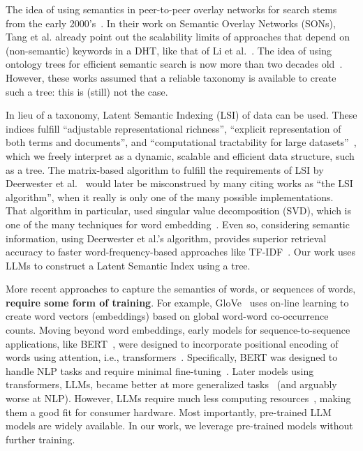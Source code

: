 \documentclass[10pt,journal]{IEEEtran}
\begin{document}
The idea of using semantics in peer-to-peer overlay networks for search stems from the early 2000's~\cite{tang2003peer}.
In their work on Semantic Overlay Networks (SONs), Tang et al. already point out the scalability limits of approaches that depend on (non-semantic) keywords in a DHT, like that of Li et al.~\cite{li2003feasibility}.
The idea of using ontology trees for efficient semantic search is now more than two decades old~\cite{crespo2004semantic}.
However, these works assumed that a reliable taxonomy is available to create such a tree: this is (still) not the case.

In lieu of a taxonomy, Latent Semantic Indexing (LSI) of data can be used.
These indices fulfill ``adjustable representational richness'', ``explicit representation of both terms and documents'', and ``computational tractability for large datasets''~\cite{deerwester1990indexing}, which we freely interpret as a dynamic, scalable and efficient data structure, such as a tree.
The matrix-based algorithm to fulfill the requirements of LSI by Deerwester et al.~\cite{deerwester1990indexing} would later be misconstrued by many citing works as ``the LSI algorithm'', when it really is only one of the many possible implementations.
That algorithm in particular, used singular value decomposition (SVD), which is one of the many techniques for word embedding~\cite{johnson2024detailed}.
Even so, considering semantic information, using Deerwester et al.'s algorithm, provides superior retrieval accuracy to faster word-frequency-based approaches like TF-IDF~\cite{zhang2011comparative}. 
Our work uses LLMs to construct a Latent Semantic Index using a tree.

More recent approaches to capture the semantics of words, or sequences of words, \textbf{require some form of training}.
For example, GloVe~\cite{pennington2014glove} uses on-line learning to create word vectors (embeddings) based on global word-word co-occurrence counts.
Moving beyond word embeddings, early models for sequence-to-sequence applications, like BERT~\cite{kenton2019bert}, were designed to incorporate positional encoding of words using attention, i.e., transformers~\cite{vaswani2017attention}.
Specifically, BERT was designed to handle NLP tasks and require minimal fine-tuning~\cite{kenton2019bert}.
Later models using transformers, LLMs, became better at more generalized tasks~\cite{min2023recent} (and arguably worse at NLP).
However, LLMs require much less computing resources~\cite{rostam2024achieving}, making them a good fit for consumer hardware.
Most importantly, pre-trained LLM models are widely available.
In our work, we leverage pre-trained models without further training.
\end{document}
